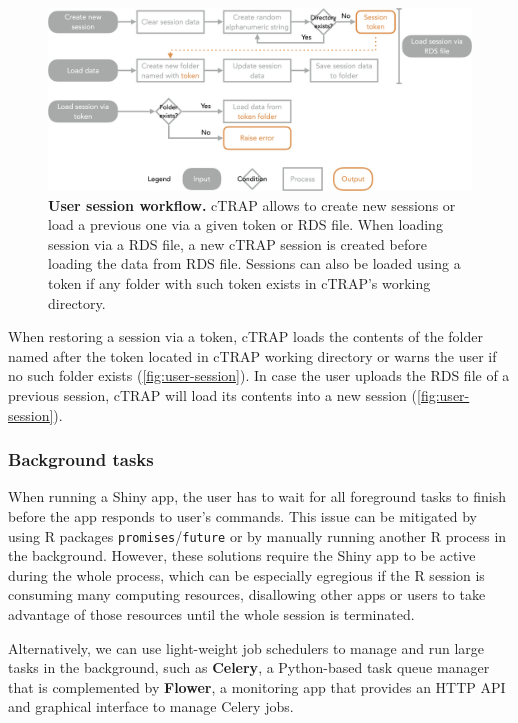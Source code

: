 \begin{figure}[!ht]
  \includegraphics[width=\textwidth]{images/ctrap/user-session}
  \centering
  \caption[User session workflow]{\textbf{User session workflow.} cTRAP allows to create new sessions or load a previous one via a given token or RDS file. When loading session via a RDS file, a new cTRAP session is created before loading the data from RDS file. Sessions can also be loaded using a token if any folder with such token exists in cTRAP's working directory.}
  \label{fig:user-session}
\end{figure}

When restoring a session via a token, cTRAP loads the contents of the folder named after the token located in cTRAP working directory or warns the user if no such folder exists (\autoref{fig:user-session}). In case the user uploads the RDS file of a previous session, cTRAP will load its contents into a new session (\autoref{fig:user-session}).

\subsubsection{Background tasks}
\label{subsec:background-tasks}

When running a Shiny app, the user has to wait for all foreground tasks to finish before the app responds to user's commands. This issue can be mitigated by using R packages \texttt{promises}/\texttt{future} or by manually running another R process in the background. However, these solutions require the Shiny app to be active during the whole process, which can be especially egregious if the R session is consuming many computing resources, disallowing other apps or users to take advantage of those resources until the whole session is terminated.

Alternatively, we can use light-weight job schedulers to manage and run large tasks in the background, such as  \textbf{Celery}, a Python-based task queue manager that is complemented by \textbf{Flower}, a monitoring app that provides an HTTP API and graphical interface to manage Celery jobs.


